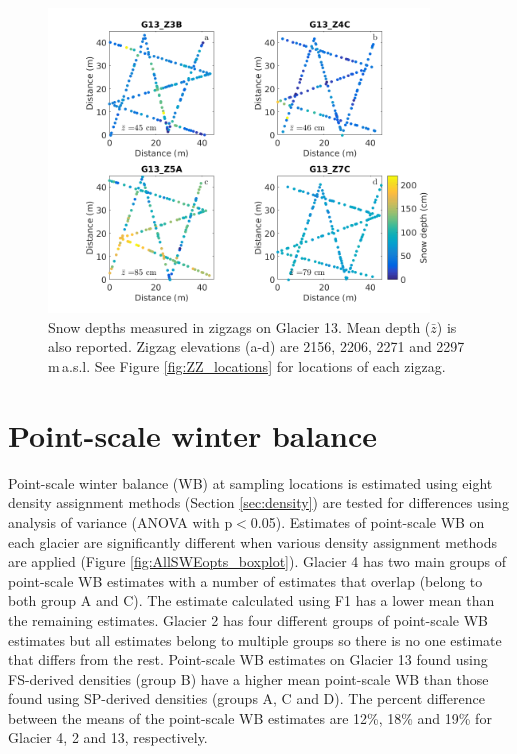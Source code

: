 \documentclass{sfuthesis}
\begin{document}
\begin{figure} 
	\centering
	 \includegraphics[width=0.9\textwidth]{ZigzagDepth_G13.png}%
	\caption{Snow depths measured in zigzags on Glacier 13. Mean depth ($\bar{z}$) is also reported. Zigzag elevations (a-d) are 2156, 2206, 2271 and 2297 \,m\,a.s.l. See Figure \ref{fig:ZZ_locations} for locations of each zigzag.}
	\label{fig:ZZ_G13}
\end{figure}


\section{Point-scale winter balance}

Point-scale winter balance (WB) at sampling locations is estimated using eight density assignment methods (Section \ref{sec:density}) are tested for differences using analysis of variance (ANOVA with p$<$0.05). Estimates of point-scale WB on each glacier are significantly different when various density assignment methods are applied (Figure \ref{fig:AllSWEopts_boxplot}). Glacier 4 has two main groups of point-scale WB estimates with a number of estimates that overlap (belong to both group A and C). The estimate calculated using F1 has a lower mean than the remaining estimates. Glacier 2 has four different groups of point-scale WB estimates but all estimates belong to multiple groups so there is no one estimate that differs from the rest. Point-scale WB estimates on Glacier 13 found using FS-derived densities (group B) have a higher mean point-scale WB than those found using SP-derived densities (groups A, C and D). The percent difference between the means of the point-scale WB estimates are 12\%, 18\% and 19\%  for Glacier 4, 2 and 13, respectively. 
\end{document}
